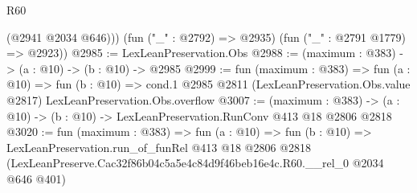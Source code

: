 \begin{lexlean}{R60}
\begin{coremodule}
          (@2941 @2034 @646)))
      (fun ("_" : @2792) => @2935)
      (fun ("_" : @2791 @1779) => @2923))
@2985 := LexLeanPreservation.Obs
@2988 := (maximum : @383) -> (a : @10) -> (b : @10) -> @2985
@2999 := fun (maximum : @383) =>
  fun (a : @10) =>
  fun (b : @10) =>
  cond.{1} @2985 @2811 (LexLeanPreservation.Obs.value @2817) LexLeanPreservation.Obs.overflow
@3007 := (maximum : @383) ->
  (a : @10) -> (b : @10) -> LexLeanPreservation.RunConv @413 @18 @2806 @2818
@3020 := fun (maximum : @383) =>
  fun (a : @10) =>
  fun (b : @10) =>
  LexLeanPreservation.run_of_funRel
    @413
    @18
    @2806
    @2818
    (LexLeanPreserve.Cac32f86b04c5a5e4c84d9f46beb16e4c.R60.__rel_0 @2034 @646 @401)
\end{coremodule}
\end{lexlean}
